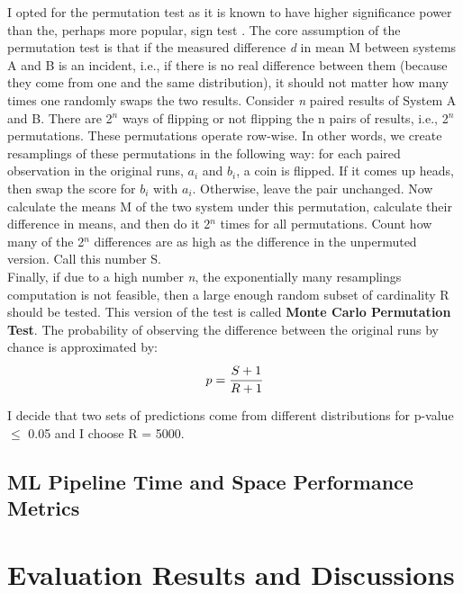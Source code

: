    I opted for the permutation test as it is known to have higher significance power than the, perhaps more popular, sign test \cite{signtest}. The core assumption of the permutation test is that if the measured difference \textit{d} in mean M between systems A and B is an incident, i.e., if there is no real difference between them (because they come from one and the same distribution), it should not matter how many times one randomly swaps the two results. Consider \textit{n} paired results of System A and B. There are 2$^n$ ways of flipping or not flipping the n pairs of results, i.e., 2$^n$ permutations. These permutations operate row-wise. In other words, we create resamplings of these permutations in the following way: for each paired observation in the original runs, $a_i$ and $b_i$, a coin is flipped. If it comes up heads, then swap the score for $b_i$ with $a_i$. Otherwise, leave the pair unchanged. Now calculate the means M of the two system under this permutation, calculate their difference in means, and then do it 2$^n$ times for all permutations. Count how many of the 2$^n$ differences are as high as the difference in the unpermuted version. Call this number S. \\
    
    Finally, if due to a high number \textit{n}, the exponentially many resamplings computation is not feasible, then a large enough random subset of cardinality R should be tested. This version of the test is called \textbf{Monte Carlo Permutation Test}. The probability of observing the difference between the original runs by chance is approximated by: \\
    
    \begin{equation}
        p = \cfrac{S + 1}{R + 1}
    \end{equation}

    \smallskip
    
    I decide that two sets of predictions come from different distributions for p-value $\leq$ 0.05 and I choose R = 5000.
    
    \subsection{ML Pipeline Time and Space Performance Metrics}
    
    \section{Evaluation Results and Discussions} \label{Evaluation Results}

